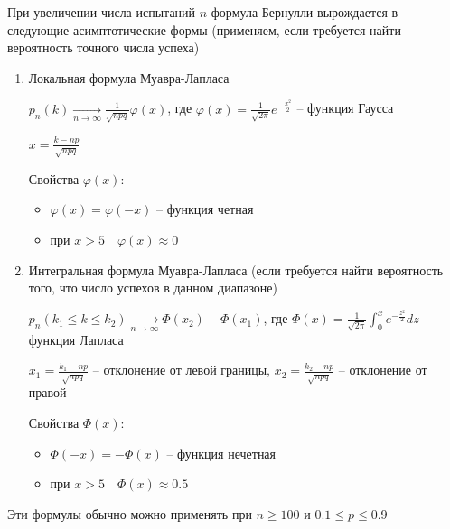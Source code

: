 \documentclass[12pt]{article}
\begin{document}
    \hypertarget{localformulademoivrelaplace}{}

    При увеличении числа испытаний $n$ формула Бернулли вырождается в следующие асимптотические формы (применяем, если требуется найти вероятность точного числа успеха)

    \begin{enumerate}
        \item Локальная формула Муавра-Лапласа

        $p_n(k) \underset{n \to \infty}{\longrightarrow} \frac{1}{\sqrt{npq}} \varphi(x)$, где $\varphi(x) = \frac{1}{\sqrt{2\pi}} e^{-\frac{x^2}{2}}$ -- функция Гаусса

        $x = \frac{k - np}{\sqrt{npq}}$

        Свойства $\varphi(x)$:

        \begin{itemize}
            \item $\varphi(x) = \varphi(-x)$ -- функция четная

            \item при $x > 5 \quad \varphi(x) \approx 0$
        \end{itemize}

        \hypertarget{integralformulademoivrelaplace}{}

        \item Интегральная формула Муавра-Лапласа (если требуется найти вероятность того, что число успехов в данном диапазоне)

        $p_n(k_1 \leq k \leq k_2) \underset{n \to \infty}{\longrightarrow} \Phi(x_2) - \Phi(x_1)$, где $\Phi(x) = \frac{1}{\sqrt{2\pi}} \int_0^x e^{-\frac{z^2}{2}} dz$ - функция Лапласа

        $x_1 = \frac{k_1 - np}{\sqrt{npq}}$ -- отклонение от левой границы, $x_2 = \frac{k_2 - np}{\sqrt{npq}}$ -- отклонение от правой

        Свойства $\Phi(x)$:

        \begin{itemize}
            \item $\Phi(-x) = -\Phi(x)$ -- функция нечетная

            \item при $x > 5 \quad \Phi(x) \approx 0.5$
        \end{itemize}
    \end{enumerate}

    \Nota Эти формулы обычно можно применять при $n \geq 100$ и $0.1 \leq p \leq 0.9$
\end{document}
